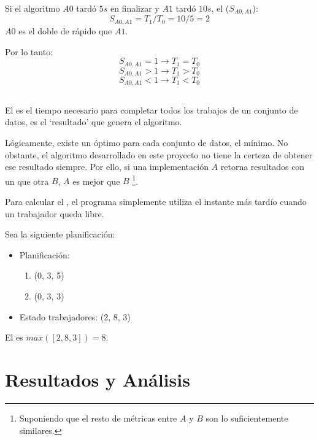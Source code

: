 \begin{examplebox}
    Si el algoritmo $A0$ tardó $5s$ en finalizar y
    $A1$ tardó $10s$, el  ($S_{A0,A1}$):
    $$
        S_{A0,A1} = T_1 / T_0 = 10 / 5 = 2
    $$
    $A0$ es el doble de rápido que $A1$.
\end{examplebox}

Por lo tanto:
$$ S_{A0,A1} = 1 \rightarrow T_1 = T_0 $$ 
$$ S_{A0,A1} > 1 \rightarrow T_1 > T_0 $$ 
$$ S_{A0,A1} < 1 \rightarrow T_1 < T_0 $$

\subsection{}

El  es el tiempo necesario para completar
todos los trabajos de un conjunto de datos,
es el `resultado' que genera el algoritmo.

Lógicamente, existe un  óptimo para cada
conjunto de datos, el mínimo.
No obstante, el algoritmo desarrollado en este proyecto
no tiene la certeza de obtener ese resultado siempre.
Por ello, si una implementación $A$ retorna
resultados con un  que otra $B$,
$A$ es mejor que $B$ \footnote{
    Suponiendo que el resto de métricas entre $A$ y $B$
    son lo suficientemente similares.
}.

Para calcular el ,
el programa simplemente utiliza el instante
más tardío cuando un trabajador queda libre.
\begin{examplebox}
    Sea la siguiente planificación:
    \begin{itemize}[itemsep=0.25px]
        \item Planificación:
        \begin{enumerate}[itemsep=0.25px]
            \item (0, 3, 5)
            \item (0, 3, 3)
        \end{enumerate}
        \item Estado trabajadores: (2, 8, 3)
    \end{itemize}

    El  es $max([2, 8, 3]) = 8$.
\end{examplebox}

\section{Resultados y Análisis}

